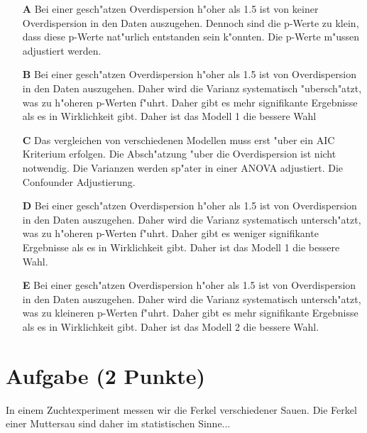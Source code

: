 \documentclass[a4paper, 10pt]{scrartcl}\usepackage[]{graphicx}\usepackage[]{xcolor}
\begin{document}
\begin{enumerate}
\item [\textbf{A} \msquare] Bei einer gesch{"a}tzen Overdispersion h{"o}her als 1.5 ist von keiner Overdispersion in den Daten auszugehen. Dennoch sind die p-Werte zu klein, dass diese p-Werte nat{"u}rlich entstanden sein k{"o}nnten. Die p-Werte m{"u}ssen adjustiert werden.
\item [\textbf{B} \msquare] Bei einer gesch{"a}tzen Overdispersion h{"o}her als 1.5 ist von Overdispersion in den Daten auszugehen. Daher wird die Varianz systematisch {"u}bersch{"a}tzt, was zu h{"o}heren p-Werten f{"u}hrt. Daher gibt es mehr signifikante Ergebnisse als es in Wirklichkeit gibt. Daher ist das Modell 1 die bessere Wahl
\item [\textbf{C} \msquare] Das vergleichen von verschiedenen Modellen muss erst {"u}ber ein AIC Kriterium erfolgen. Die Absch{"a}tzung {"u}ber die Overdispersion ist nicht notwendig. Die Varianzen werden sp{"a}ter in einer ANOVA adjustiert. Die Confounder Adjustierung.
\item [\textbf{D} \msquare] Bei einer gesch{"a}tzen Overdispersion h{"o}her als 1.5 ist von Overdispersion in den Daten auszugehen. Daher wird die Varianz systematisch untersch{"a}tzt, was zu h{"o}heren p-Werten f{"u}hrt. Daher gibt es weniger signifikante Ergebnisse als es in Wirklichkeit gibt. Daher ist das Modell 1 die bessere Wahl.
\item [\textbf{E} \msquare] Bei einer gesch{"a}tzen Overdispersion h{"o}her als 1.5 ist von Overdispersion in den Daten auszugehen. Daher wird die Varianz systematisch untersch{"a}tzt, was zu kleineren p-Werten f{"u}hrt. Daher gibt es mehr signifikante Ergebnisse als es in Wirklichkeit gibt. Daher ist das Modell 2 die bessere Wahl.
\end{enumerate}

\section{Aufgabe \hfill (2 Punkte)}

In einem Zuchtexperiment messen wir die Ferkel verschiedener Sauen. Die
Ferkel einer Muttersau sind daher im statistischen Sinne... 
\end{document}

